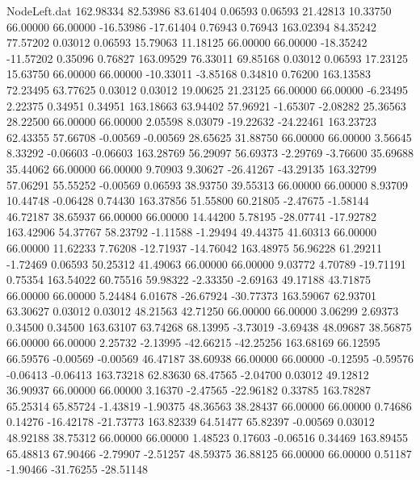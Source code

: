 \begin{filecontents}{NodeLeft.dat}
 162.98334   82.53986   83.61404     0.06593    0.06593   21.42813   10.33750   66.00000   66.00000  -16.53986  -17.61404    0.76943    0.76943
 163.02394   84.35242   77.57202     0.03012    0.06593   15.79063   11.18125   66.00000   66.00000  -18.35242  -11.57202    0.35096    0.76827
 163.09529   76.33011   69.85168     0.03012    0.06593   17.23125   15.63750   66.00000   66.00000  -10.33011   -3.85168    0.34810    0.76200
 163.13583   72.23495   63.77625     0.03012    0.03012   19.00625   21.23125   66.00000   66.00000   -6.23495    2.22375    0.34951    0.34951
 163.18663   63.94402   57.96921    -1.65307   -2.08282   25.36563   28.22500   66.00000   66.00000    2.05598    8.03079  -19.22632  -24.22461
 163.23723   62.43355   57.66708    -0.00569   -0.00569   28.65625   31.88750   66.00000   66.00000    3.56645    8.33292   -0.06603   -0.06603
 163.28769   56.29097   56.69373    -2.29769   -3.76600   35.69688   35.44062   66.00000   66.00000    9.70903    9.30627  -26.41267  -43.29135
 163.32799   57.06291   55.55252    -0.00569    0.06593   38.93750   39.55313   66.00000   66.00000    8.93709   10.44748   -0.06428    0.74430
 163.37856   51.55800   60.21805    -2.47675   -1.58144   46.72187   38.65937   66.00000   66.00000   14.44200    5.78195  -28.07741  -17.92782
 163.42906   54.37767   58.23792    -1.11588   -1.29494   49.44375   41.60313   66.00000   66.00000   11.62233    7.76208  -12.71937  -14.76042
 163.48975   56.96228   61.29211    -1.72469    0.06593   50.25312   41.49063   66.00000   66.00000    9.03772    4.70789  -19.71191    0.75354
 163.54022   60.75516   59.98322    -2.33350   -2.69163   49.17188   43.71875   66.00000   66.00000    5.24484    6.01678  -26.67924  -30.77373
 163.59067   62.93701   63.30627     0.03012    0.03012   48.21563   42.71250   66.00000   66.00000    3.06299    2.69373    0.34500    0.34500
 163.63107   63.74268   68.13995    -3.73019   -3.69438   48.09687   38.56875   66.00000   66.00000    2.25732   -2.13995  -42.66215  -42.25256
 163.68169   66.12595   66.59576    -0.00569   -0.00569   46.47187   38.60938   66.00000   66.00000   -0.12595   -0.59576   -0.06413   -0.06413
 163.73218   62.83630   68.47565    -2.04700    0.03012   49.12812   36.90937   66.00000   66.00000    3.16370   -2.47565  -22.96182    0.33785
 163.78287   65.25314   65.85724    -1.43819   -1.90375   48.36563   38.28437   66.00000   66.00000    0.74686    0.14276  -16.42178  -21.73773
 163.82339   64.51477   65.82397    -0.00569    0.03012   48.92188   38.75312   66.00000   66.00000    1.48523    0.17603   -0.06516    0.34469
 163.89455   65.48813   67.90466    -2.79907   -2.51257   48.59375   36.88125   66.00000   66.00000    0.51187   -1.90466  -31.76255  -28.51148

\end{filecontents}
